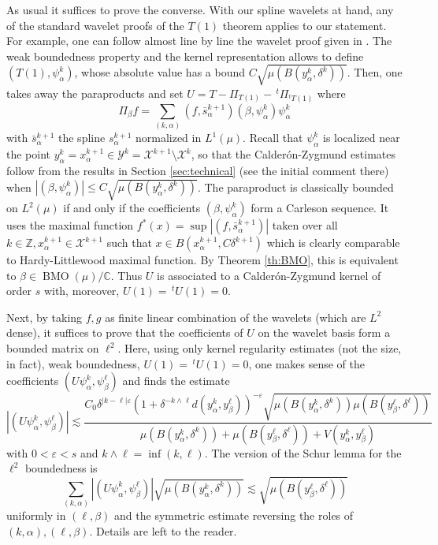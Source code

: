 \documentclass{amsart}
\numberwithin{equation}{section}
\theoremstyle{plain}
\theoremstyle{definition}
\theoremstyle{remark}
\begin{document}
{{{ As usual it suffices to prove the converse. {With our spline wavelets at hand,} any of the standard {wavelet} proofs of the $T(1)$ theorem applies to our  statement. For example,  one can follow almost line by line the wavelet proof given in \cite[pp. 267-270]{M2}.  The weak boundedness property and the kernel representation allows to define $(T(1), \psi^k_{\alpha})$, whose absolute value  has a bound  $C\sqrt{\mu(B(y^k_{\alpha}, \delta ^k))}$.
 Then, one takes away the paraproducts  and set $U=T-\Pi_{T(1)}- \,^t\Pi_{^tT(1)}$ where
 $$
 \Pi_{\beta}f= \sum_{(k,\alpha)} (f,\bar s^{k+1}_{\alpha}) (\beta, \psi^k_{\alpha}) \psi^k_{\alpha}
 $$
 with $\bar s^{k+1}_{\alpha}$  the spline $s^{k+1}_{\alpha}$ normalized in $L^1(\mu)$. Recall that $\psi^k_{\alpha}$ is localized near the point $y^k_{\alpha}= x^{k+1}_{\alpha}\in \mathscr{Y}^{k}=\mathscr{X}^{k+1}\setminus \mathscr{X}^{k}$, 
 so that the Calder\'on-Zygmund estimates follow from the results in Section \ref{sec:technical} (see the initial comment there) when ${|{(\beta, \psi^k_{\alpha})}|} \le C\sqrt{\mu(B(y^k_{\alpha}, \delta ^k))}$. The paraproduct is classically bounded on $L^2(\mu)$ if and only if the coefficients $(\beta, \psi^k_{\alpha})$ form a Carleson sequence.  It uses the maximal function $f^*(x)=\sup |(f,\bar s^{k+1}_{\alpha})|$ taken over all $k\in {\mathbb{Z}}, x^{k+1}_{\alpha}\in \mathscr{X}^{k+1}$ such that $x\in B(x^{k+1}_{\alpha}, C\delta ^{k+1})$ which is clearly comparable to Hardy-Littlewood maximal function. By Theorem \ref{th:BMO}, this is equivalent to $\beta\in {\operatorname{BMO}}(\mu)/{\mathbb{C}}$.
Thus $U$ is associated to a Calder\'on-Zygmund kernel  of order $s$ with, moreover, $U(1)=\,^tU(1)=0$. 
 
 Next, by taking $f,g$ as finite linear combination of the wavelets (which are $L^2$ dense), it suffices to prove that the coefficients of $U$ on the wavelet basis form a bounded matrix on $\ell^2$. Here, using only kernel regularity estimates (not the size, in fact), weak boundedness, $U(1)=\,^tU(1)=0$, one makes sense of the coefficients $(U\psi^k_{\alpha}, \psi^\ell_{\beta})$ and  finds the estimate
 \begin{equation}\label{eq:Ucoeff}
 |(U\psi^k_{\alpha}, \psi^\ell_{\beta})| \lesssim  \frac{C_{0}\delta ^{|k-\ell|\varepsilon}(1+\delta ^{-k\wedge \ell} d(y^{k}_{\alpha}, y^{\ell}_{\beta}))^{-\varepsilon}\sqrt{\mu(B(y^{k}_{\alpha},\delta ^{k}))\mu(B(y^{\ell}_{\beta},\delta ^{\ell}))}}{\mu(B(y^{k}_{\alpha}, \delta^{k}))+\mu(B(y^{\ell}_{\beta}, \delta ^{\ell}))+V(y^{k}_{\alpha}, y^{\ell}_{\beta})}
\end{equation}
with $0<\varepsilon<s$ and $k\wedge \ell= \inf(k,\ell)$.  The version of the Schur lemma for the $\ell^2$ boundedness
 is
 $$
 \sum_{(k,\alpha)}  |(U\psi^k_{\alpha}, \psi^\ell_{\beta})|\sqrt{\mu(B(y^{k}_{\alpha},\delta ^{k}))} \lesssim \sqrt{\mu(B(y^{\ell}_{\beta},\delta ^{\ell}))}
 $$
 uniformly in $(\ell,\beta)$ and the symmetric estimate reversing the roles of $(k,\alpha), (\ell, \beta)$. 
Details are left to the reader.   

}}}
\end{document}
